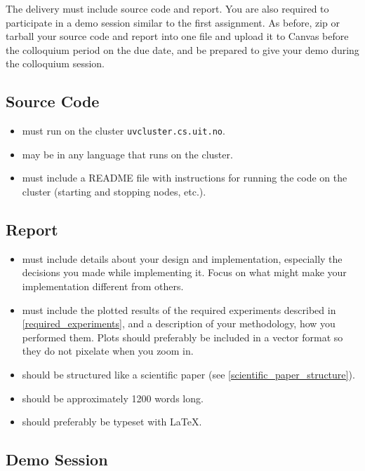 \documentclass[]{article}
\begin{document}
The delivery must include source code and report.
You are also required to participate in a demo session similar to the first assignment.
As before, zip or tarball your source code and report into one file and upload it to Canvas before the colloquium period on the due date, and be prepared to give your demo during the colloquium session.

\subsection{Source Code}

\begin{itemize}
    \item must run on the cluster \texttt{uvcluster.cs.uit.no}.
    \item may be in any language that runs on the cluster.
    \item must include a README file with instructions for running the code on the cluster (starting and stopping nodes, etc.).
\end{itemize}

\subsection{Report}

\begin{itemize}
    \item must include details about your design and implementation,
        especially the decisions you made while implementing it.
        Focus on what might make your implementation different from others.
    \item must include the plotted results of the required experiments described in \autoref{required_experiments},
        and a description of your methodology, how you performed them.
        Plots should preferably be included in a vector format so they do not pixelate when you zoom in.
    \item should be structured like a scientific paper (see \autoref{scientific_paper_structure}).
    \item should be approximately 1200 words long.
    \item should preferably be typeset with \LaTeX{}.
\end{itemize}

\subsection{Demo Session}
\end{document}
